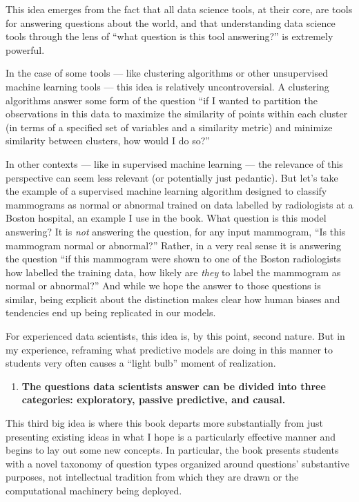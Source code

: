 \documentclass[12pt]{article}
\begin{document}
This idea emerges from the fact that all data science tools, at their
core, are tools for answering questions about the world, and that
understanding data science tools through the lens of ``what question is
this tool answering?'' is extremely powerful.

In the case of some tools --- like clustering algorithms or other
unsupervised machine learning tools --- this idea is relatively
uncontroversial. A clustering algorithms answer some form of the
question ``if I wanted to partition the observations in this data to
maximize the similarity of points within each cluster (in terms of a
specified set of variables and a similarity metric) and minimize
similarity between clusters, how would I do so?''

In other contexts --- like in supervised machine learning --- the
relevance of this perspective can seem less relevant (or potentially
just pedantic). But let's take the example of a supervised machine
learning algorithm designed to classify mammograms as normal or abnormal
trained on data labelled by radiologists at a Boston hospital, an
example I use in the book. What question is this model answering? It is
\emph{not} answering the question, for any input mammogram, ``Is this
mammogram normal or abnormal?'' Rather, in a very real sense it is
answering the question ``if this mammogram were shown to one of the
Boston radiologists how labelled the training data, how likely are
\emph{they} to label the mammogram as normal or abnormal?'' And while we
hope the answer to those questions is similar, being explicit about the
distinction makes clear how human biases and tendencies end up being
replicated in our models.

For experienced data scientists, this idea is, by this point, second
nature. But in my experience, reframing what predictive models are doing
in this manner to students very often causes a ``light bulb'' moment of
realization.

\begin{enumerate}
\def\labelenumi{\arabic{enumi}.}
\setcounter{enumi}{2}

\item
  \textbf{The questions data scientists answer can be divided into three
  categories: exploratory, passive predictive, and causal.}
\end{enumerate}

This third big idea is where this book departs more substantially from
just presenting existing ideas in what I hope is a particularly
effective manner and begins to lay out some new concepts. In particular,
the book presents students with a novel taxonomy of question types
organized around questions' substantive purposes, not intellectual
tradition from which they are drawn or the computational machinery being
deployed.
\end{document}
